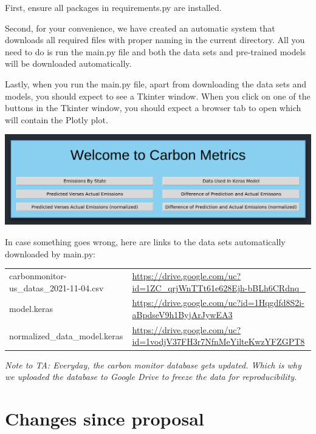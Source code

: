 \documentclass[fontsize=11pt]{article}
\begin{document}
First, ensure all packages in requirements.py are installed.

Second, for your convenience, we have created an automatic system that downloads all required files with proper naming in the current directory. All you need to do is run the main.py file and both the data sets and pre-trained models will be downloaded automatically.

Lastly, when you run the main.py file, apart from downloading the data sets and models, you should expect to see a Tkinter window. When you click on one of the buttons in the Tkinter window, you should expect a browser tab to open which will contain the Plotly plot.

\begin{center}
    \includegraphics[scale=0.5]{app.png}
\end{center}

In case something goes wrong, here are links to the data sets automatically downloaded by main.py:

\renewcommand{\arraystretch}{1.5}
\begin{tabular}{ p{7cm} p{7cm} }
 carbonmonitor-us\_datas\_2021-11-04.csv & \url{https://drive.google.com/uc?id=1ZC_qrjWnTTt61e628Ejh-bBLh6CRdnq_} \\ 
 model.keras & \url{https://drive.google.com/uc?id=1Hqgdfd8S2i-aBpdseV9h1ByjArJywEA3} \\  
 normalized\_data\_model.keras & \url{https://drive.google.com/uc?id=1vodjV37FH3r7NfnMeYilteKwzYFZGPT8}    
\end{tabular}

\textit{Note to TA: Everyday, the carbon monitor database gets updated. Which is why we uploaded the database to Google Drive to freeze the data for reproducibility.}


\section{Changes since proposal}
\end{document}
